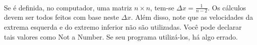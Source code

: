 \documentclass[introducao.tex]{subfiles}
\begin{document}
\paragraph{} Se é definida, no computador, uma matriz $n\times n$, tem-se $\Delta x = \frac{1}{n-2}$. Os cálculos devem ser todos feitos com base neste $\Delta x$. Além disso, note que as velocidades da extrema esquerda e do extremo inferior não são utilizadas. Você pode declarar tais valores como Not a Number. Se seu programa utilizá-los, há algo errado.

\domainOne
\end{document}
